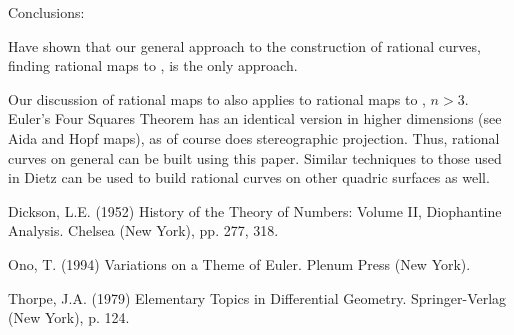 Conclusions:

Have shown that our general approach to the construction
of rational curves, finding rational maps to ,
is the only approach.

Our discussion of rational maps to  also applies to
rational maps to , $n > 3$.
Euler's Four Squares Theorem has an identical version in higher dimensions
(see Aida and Hopf maps),
as of course does stereographic projection.
Thus, rational curves on general  can be built using this paper.
Similar techniques to those used in Dietz \cite{} can be used to build
rational curves on other quadric surfaces as well.



\begin{thebibliography}{Dickson 52}

Dickson, L.E. (1952) History of the Theory of Numbers: Volume II,
Diophantine Analysis.  Chelsea (New York), pp. 277, 318.

Ono, T. (1994) Variations on a Theme of Euler.
Plenum Press (New York).

Thorpe, J.A. (1979) Elementary Topics in Differential Geometry.
Springer-Verlag (New York), p. 124.

\end{thebibliography}


